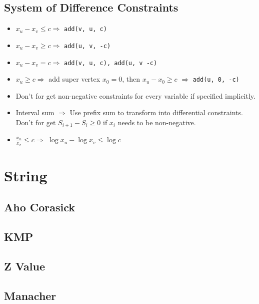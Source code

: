 \documentclass[a4paper,10pt,twocolumn,oneside,x11names]{article}
\begin{document}
\subsection{System of Difference Constraints}

\begin{itemize}
	\item $x_u - x_v \le c \Rightarrow$ \texttt{add(v, u, c)}
	\item $x_u - x_v \ge c \Rightarrow$ \texttt{add(u, v, -c)}
	\item $x_u - x_v = c \Rightarrow$ \texttt{add(v, u, c), add(u, v -c)}
	\item $x_u \ge c \Rightarrow$ add super vertex $x_0 = 0$, then $x_u - x_0 \ge c$ $\Rightarrow$ \texttt{add(u, 0, -c)}
	\item Don't for get non-negative constraints for every variable if specified implicitly.
	\item Interval sum $\Rightarrow$ Use prefix sum to transform into differential constraints.  Don't for get $S_{i+1} - S_{i} \ge 0$ if $x_i$ needs to be non-negative.
	\item $\frac{x_u}{x_v} \le c \Rightarrow$ $\log{x_u} - \log{x_v} \le \log{c}$
\end{itemize}


\section{String}

\subsection{Aho Corasick}


\subsection{KMP}


\subsection{Z Value}


\subsection{Manacher}

\end{document}
